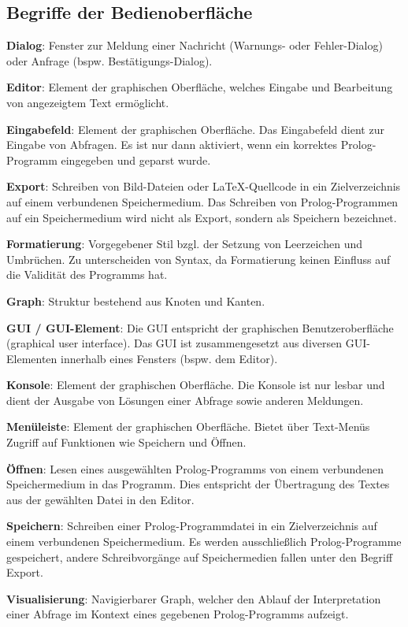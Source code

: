 \documentclass[parskip=full,11pt,twoside]{scrartcl}
\begin{document}
\subsection{Begriffe der Bedienoberfläche}
\textbf{Dialog}:
Fenster zur Meldung einer Nachricht (Warnungs- oder Fehler-Dialog) oder Anfrage (bspw. Bestätigungs-Dialog).

\textbf{Editor}:
Element der graphischen Oberfläche, welches Eingabe und Bearbeitung von angezeigtem Text ermöglicht.

\textbf{Eingabefeld}:
Element der graphischen Oberfläche. Das Eingabefeld dient zur Eingabe von Abfragen. Es ist nur dann aktiviert, wenn ein korrektes Prolog-Programm eingegeben und geparst wurde.

\textbf{Export}:
Schreiben von Bild-Dateien oder LaTeX-Quellcode in ein Zielverzeichnis auf einem verbundenen Speichermedium. Das Schreiben von Prolog-Programmen auf ein Speichermedium wird nicht als Export, sondern als Speichern bezeichnet.

\textbf{Formatierung}:
Vorgegebener Stil bzgl. der Setzung von Leerzeichen und Umbrüchen. Zu unterscheiden von Syntax, da Formatierung keinen Einfluss auf die Validität des Programms hat.

\textbf{Graph}:
Struktur bestehend aus Knoten und Kanten.

\textbf{GUI / GUI-Element}:
Die GUI entspricht der graphischen Benutzeroberfläche (graphical user interface). Das GUI ist zusammengesetzt aus diversen GUI-Elementen innerhalb eines Fensters (bspw. dem Editor).

\textbf{Konsole}:
Element der graphischen Oberfläche. Die Konsole ist nur lesbar und dient der Ausgabe von Lösungen einer Abfrage sowie anderen Meldungen. 

\textbf{Menüleiste}:
Element der graphischen Oberfläche. Bietet über Text-Menüs Zugriff auf Funktionen wie Speichern und Öffnen.

\textbf{Öffnen}:
Lesen eines ausgewählten Prolog-Programms von einem verbundenen Speichermedium in das Programm. Dies entspricht der Übertragung des Textes aus der gewählten Datei in den Editor.

\textbf{Speichern}:
Schreiben einer Prolog-Programmdatei in ein Zielverzeichnis auf einem verbundenen Speichermedium. Es werden ausschließlich Prolog-Programme gespeichert, andere Schreibvorgänge auf Speichermedien fallen unter den Begriff Export.

\textbf{Visualisierung}:
Navigierbarer Graph, welcher den Ablauf der Interpretation einer Abfrage im Kontext eines gegebenen Prolog-Programms aufzeigt.
\end{document}
